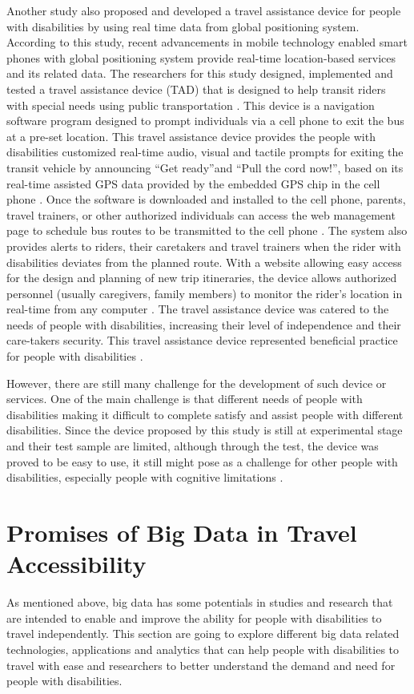 Another study also proposed and developed a travel assistance device for people with 
disabilities by using real time data from global positioning system. According to 
this study, recent advancements in mobile technology enabled smart phones with global 
positioning system provide real-time location-based services and its related data.
The researchers for this study designed, implemented and tested a travel assistance device (TAD) 
that is designed to help transit riders with special needs using public transportation
\cite{Barbeau}. This device is a navigation software program designed to prompt 
individuals via a cell phone to exit the bus at a pre-set location. 
This travel assistance device provides the people with disabilities 
customized real-time audio, visual and tactile prompts for exiting the transit vehicle 
by announcing ``Get ready''and ``Pull the cord now!'', based on  its real-time assisted 
GPS data provided by the embedded GPS chip in the cell phone \cite{Barbeau}.  
Once the software is downloaded and installed to the cell phone,
parents, travel trainers, or other authorized individuals can access the web management
page to schedule bus routes to be transmitted to the cell phone \cite{Barbeau}.  The system also 
provides alerts to riders, their caretakers and travel trainers when the rider with 
disabilities deviates from the planned route. With a website allowing easy access 
for the design and planning of new trip itineraries, the device allows authorized 
personnel (usually caregivers, family members) to monitor the rider’s location 
in real-time from any computer \cite{Barbeau}. The travel assistance device was 
catered to the needs of people with disabilities, increasing their level of 
independence and their care-takers security. This travel assistance device 
represented beneficial practice for people with disabilities \cite{Barbeau}.

However, there are still many challenge for the development of such device or services. 
One of the main challenge is that different needs of people with disabilities
making it difficult to complete satisfy and assist people with different disabilities. 
Since the device proposed by this study is still at experimental stage and their 
test sample are limited, although through the test, the device was proved to be 
easy to use, it still might pose as a challenge for other people with disabilities, 
especially people with cognitive limitations \cite{Barbeau}. 


\section{Promises of Big Data in Travel Accessibility}
As mentioned above, big data has some potentials in studies and research that are intended 
to enable and improve the ability for people with disabilities to travel independently. 
This section are going to explore different big data related technologies, applications and 
analytics that can help people with disabilities to travel with ease and researchers to 
better understand the demand and need for people with disabilities.
